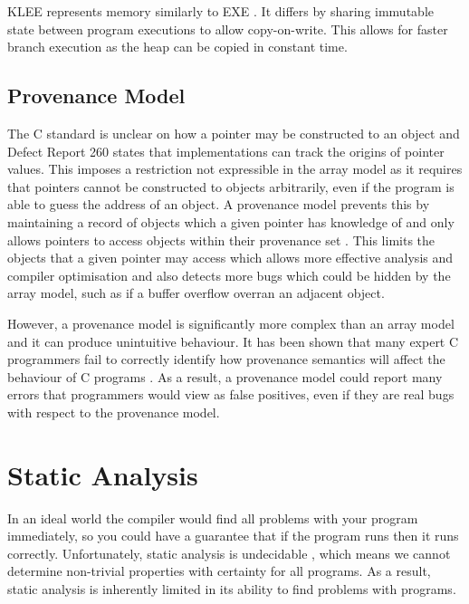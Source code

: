 \documentclass[12pt,twoside]{report}
\begin{document}
KLEE \cite{cadar2008klee} represents memory similarly to EXE \cite{cadar2008exe}. It differs by sharing immutable state between program executions to allow copy-on-write. This allows for faster branch execution as the heap can be copied in constant time.


\subsection{Provenance Model}
The C standard is unclear on how a pointer may be constructed to an object \cite{memarian2019exploring} and Defect Report 260 \cite{defectreport260} states that implementations can track the origins of pointer values. This imposes a restriction not expressible in the array model as it requires that pointers cannot be constructed to objects arbitrarily, even if the program is able to guess the address of an object. A provenance model prevents this by maintaining a record of objects which a given pointer has knowledge of and only allows pointers to access objects within their provenance set \cite{memarian2019exploring}. This limits the objects that a given pointer may access which allows more effective analysis and compiler optimisation and also detects more bugs which could be hidden by the array model, such as if a buffer overflow overran an adjacent object.

However, a provenance model is significantly more complex than an array model and it can produce unintuitive behaviour. It has been shown that many expert C programmers fail to correctly identify how provenance semantics will affect the behaviour of C programs \cite{can't find the reference for this}. As a result, a provenance model could report many errors that programmers would view as false positives, even if they are real bugs with respect to the provenance model.

\section{Static Analysis}
In an ideal world the compiler would find all problems with your program immediately, so you could have a guarantee that if the program runs then it runs correctly. Unfortunately, static analysis is undecidable \cite{10.1145/161494.161501}, which means we cannot determine non-trivial properties with certainty for all programs. As a result, static analysis is inherently limited in its ability to find problems with programs.
\end{document}
